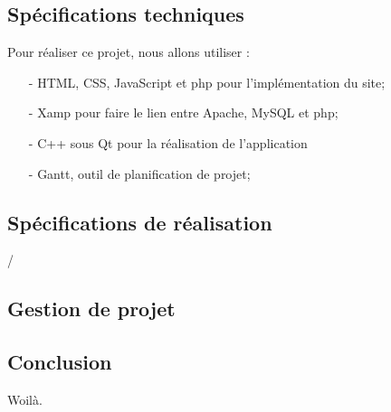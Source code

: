 \documentclass[a4paper]{article}
\begin{document}
	\subsection{Spécifications techniques}
	Pour réaliser ce projet, nous allons utiliser :
	\begin{itemize}
		\item[-] HTML, CSS, JavaScript et php pour l'implémentation du site;
		\item[-] Xamp pour faire le lien entre Apache, MySQL et php;
		\item[-] C++ sous Qt pour la réalisation de l'application
		\item[-] Gantt, outil de planification de projet;
	\end{itemize}
	\subsection{Spécifications de réalisation}
		/
	\subsection{Gestion de projet}
		
	\subsection*{Conclusion}
	Woilà.
\end{document}
